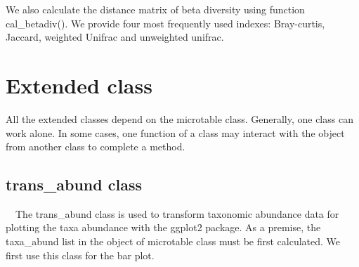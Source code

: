 \documentclass[
]{book}
\newenvironment{Shaded}{\begin{snugshade}}{\end{snugshade}}
\newcommand{\AttributeTok}[1]{\textcolor[rgb]{0.77,0.63,0.00}{#1}}
\newcommand{\CommentTok}[1]{\textcolor[rgb]{0.56,0.35,0.01}{\textit{#1}}}
\newcommand{\ConstantTok}[1]{\textcolor[rgb]{0.00,0.00,0.00}{#1}}
\newcommand{\DecValTok}[1]{\textcolor[rgb]{0.00,0.00,0.81}{#1}}
\newcommand{\FunctionTok}[1]{\textcolor[rgb]{0.00,0.00,0.00}{#1}}
\newcommand{\NormalTok}[1]{#1}
\newcommand{\OtherTok}[1]{\textcolor[rgb]{0.56,0.35,0.01}{#1}}
\newcommand{\SpecialCharTok}[1]{\textcolor[rgb]{0.00,0.00,0.00}{#1}}
\newcommand{\StringTok}[1]{\textcolor[rgb]{0.31,0.60,0.02}{#1}}
\begin{document}
We also calculate the distance matrix of beta diversity using function cal\_betadiv().
We provide four most frequently used indexes: Bray-curtis, Jaccard, weighted Unifrac and unweighted unifrac.

\begin{Shaded}
\end{Shaded}

\hypertarget{extended-class}{%
\chapter{Extended class}\label{extended-class}}

All the extended classes depend on the microtable class.
Generally, one class can work alone.
In some cases, one function of a class may interact with the object from another class to complete a method.

\hypertarget{trans_abund-class}{%
\section{trans\_abund class}\label{trans_abund-class}}

　The trans\_abund class is used to transform taxonomic abundance data for plotting the taxa abundance with the ggplot2 package.
As a premise, the taxa\_abund list in the object of microtable class must be first calculated.
We first use this class for the bar plot.

\begin{Shaded}
\end{Shaded}
\end{document}
